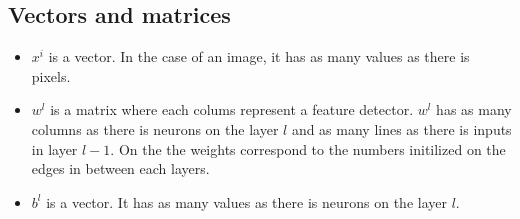 \begin{appendices}
	\section{Vectors and matrices}
	\label{sec:vectors_and_matrices}
		\begin{itemize}
			\item $x^i$ is a vector. In the case of an image, it has as many values as there is pixels.
			\item $w^l$ is a matrix where each colums represent a feature detector. $w^l$ has as many columns as there is neurons on the layer $l$ and as many lines as there is inputs in layer $l-1$. On the  the weights correspond to the numbers initilized on the edges in between each layers.
			\item $b^l$ is a vector. It has as many values as there is neurons on the layer $l$.
		\end{itemize}
	




\end{appendices}
		

